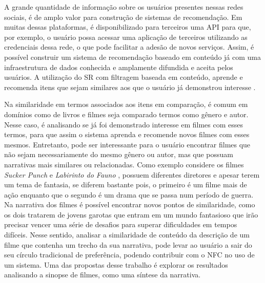 A grande quantidade de informação sobre os usuários presentes nessas redes sociais, é de amplo valor para construção de sistemas de recomendação. Em muitas dessas plataformas, é disponibilizado para terceiros uma \ac{API} para que, por exemplo, o usuário possa acessar uma aplicação de terceiros utilizando as credenciais dessa rede, o que pode facilitar a adesão de novos serviços. Assim, é possível construir um sistema de recomendação baseado em conteúdo já com uma infraestrutura de dados conhecida e amplamente difundida e aceita pelos usuários. A utilização do \ac{SR} com filtragem baseada em conteúdo, aprende e recomenda itens que sejam similares aos que o usuário já demonstrou interesse \citep{Ricci2011}.

Na similaridade em termos associados aos itens em comparação, é comum em domínios como de livros e filmes seja comparado termos como gênero e autor. Nesse caso, é analisando se já foi demonstrado interesse em filmes com esses termos, para que assim o sistema aprenda e recomende novos filmes com esses mesmos. Entretanto, pode ser interessante para o usuário encontrar filmes que não sejam necessariamente do mesmo gênero ou autor, mas que possuam narrativas mais similares ou relacionadas. Como exemplo considere os filmes \textit{Sucker Punch} \citep{SuckerPunch2011} e \textit{Labirinto do Fauno} \citep{LaberintoFauno2006}, possuem diferentes diretores e apesar terem um tema de fantasia, se diferem bastante pois, o primeiro é um filme mais de ação enquanto que o segundo é um drama que se passa num período de guerra. Na narrativa dos filmes é possível encontrar novos pontos de similaridade, como os dois tratarem de jovens garotas que entram em um mundo fantasioso que irão precisar vencer uma série de desafios para superar dificuldades em tempos difíceis. Nesse sentido, analisar a similaridade de conteúdo da descrição de um filme que contenha um trecho da sua narrativa, pode levar ao usuário a sair do seu círculo tradicional de preferência, podendo contribuir com o NFC no uso de um sistema. Uma das propostas desse trabalho é explorar os resultados analisando a sinopse de filmes, como uma síntese da narrativa.

